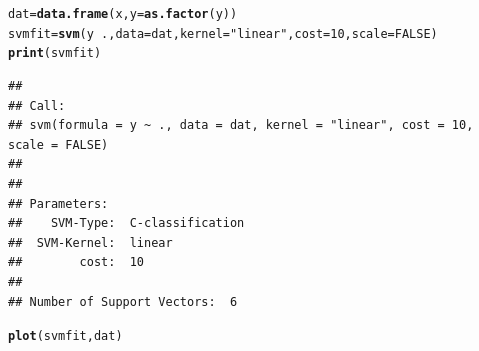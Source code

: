 \documentclass[aspectratio=169]{beamer}\usepackage[]{graphicx}\usepackage[]{xcolor}
\makeatletter
\newcommand{\hlnum}[1]{\textcolor[rgb]{0.686,0.059,0.569}{#1}}%
\newcommand{\hlsng}[1]{\textcolor[rgb]{0.192,0.494,0.8}{#1}}%
\newcommand{\hlopt}[1]{\textcolor[rgb]{0,0,0}{#1}}%
\newcommand{\hldef}[1]{\textcolor[rgb]{0.345,0.345,0.345}{#1}}%
\newcommand{\hlkwb}[1]{\textcolor[rgb]{0.69,0.353,0.396}{#1}}%
\newcommand{\hlkwc}[1]{\textcolor[rgb]{0.333,0.667,0.333}{#1}}%
\newcommand{\hlkwd}[1]{\textcolor[rgb]{0.737,0.353,0.396}{\textbf{#1}}}%
\newenvironment{kframe}{%
 \def\at@end@of@kframe{}%
 \ifinner\ifhmode%
  \def\at@end@of@kframe{\end{minipage}}%
  \begin{minipage}{\columnwidth}%
 \fi\fi%
 \def\FrameCommand##1{\hskip\@totalleftmargin \hskip-\fboxsep
 \colorbox{shadecolor}{##1}\hskip-\fboxsep
     \hskip-\linewidth \hskip-\@totalleftmargin \hskip\columnwidth}%
 \MakeFramed {\advance\hsize-\width
   \@totalleftmargin\z@ \linewidth\hsize
   \@setminipage}}%
 {\par\unskip\endMakeFramed%
 \at@end@of@kframe}
\newenvironment{knitrout}{}{} %
\makeatother
\begin{document}

\begin{frame}[fragile]
\begin{knitrout}
\color{fgcolor}\begin{kframe}
\begin{alltt}
\hldef{dat} \hlkwb{=} \hlkwd{data.frame}\hldef{(x,} \hlkwc{y} \hldef{=} \hlkwd{as.factor}\hldef{(y))}
\hldef{svmfit} \hlkwb{=} \hlkwd{svm}\hldef{(y} \hlopt{~} \hldef{.,} \hlkwc{data} \hldef{= dat,} \hlkwc{kernel} \hldef{=} \hlsng{"linear"}\hldef{,} \hlkwc{cost} \hldef{=} \hlnum{10}\hldef{,} \hlkwc{scale} \hldef{=} \hlnum{FALSE}\hldef{)}
\hlkwd{print}\hldef{(svmfit)}
\end{alltt}
\begin{verbatim}
## 
## Call:
## svm(formula = y ~ ., data = dat, kernel = "linear", cost = 10, scale = FALSE)
## 
## 
## Parameters:
##    SVM-Type:  C-classification 
##  SVM-Kernel:  linear 
##        cost:  10 
## 
## Number of Support Vectors:  6
\end{verbatim}
\begin{alltt}
\hlkwd{plot}\hldef{(svmfit, dat)}
\end{alltt}
\end{kframe}
\end{knitrout}
\end{frame}

\end{document}
